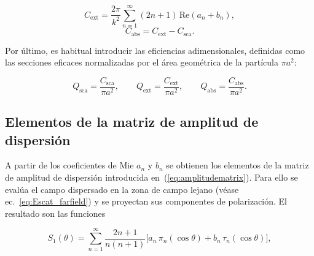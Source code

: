 \begin{equation}
  C_{\text{ext}} = \frac{2\pi}{k^2}
  \sum_{n=1}^{\infty} (2n+1)
  \,\mathrm{Re}(a_n + b_n),
\end{equation}
\begin{equation}
  C_{\text{abs}} = C_{\text{ext}} - C_{\text{sca}}.
\end{equation}


Por último, es habitual introducir las eficiencias adimensionales, definidas como las
secciones eficaces normalizadas por el área geométrica de la partícula
$\pi a^2$:

\begin{equation}
  Q_{\text{sca}} = \frac{C_{\text{sca}}}{\pi a^2},
  \qquad
  Q_{\text{ext}} = \frac{C_{\text{ext}}}{\pi a^2},
  \qquad
  Q_{\text{abs}} = \frac{C_{\text{abs}}}{\pi a^2}.
\end{equation}


\subsection{Elementos de la matriz de amplitud de dispersión}

A partir de los coeficientes de Mie $a_n$ y $b_n$ se obtienen los elementos de
la matriz de amplitud de dispersión introducida en~(\ref{eq:amplitudematrix}).
Para ello se evalúa el campo dispersado en la zona de campo lejano
(véase ec.~\ref{eq:Escat_farfield}) y se proyectan sus componentes de
polarización. El resultado son las funciones

\begin{equation}
\label{eq:S1S2}
  S_1(\theta) = \sum_{n=1}^{\infty} \frac{2n+1}{n(n+1)}
  \bigl[ a_n\,\pi_n(\cos\theta) + b_n\,\tau_n(\cos\theta) \bigr],
\end{equation}

